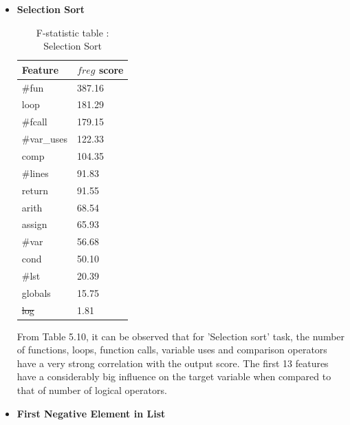 \begin{itemize}
    \item \textbf{Selection Sort
}
            \begin{table}[H]
            \centering
            \begin{tabular}{|l|l|}
            \hline
            \textbf{Feature} & \textbf{$f{reg}$ score} \\ \hline
            \#fun            & 387.16                \\ \hline
            loop             & 181.29                \\ \hline
            \#fcall          & 179.15                \\ \hline
            \#var\_uses      & 122.33                \\ \hline
            comp             & 104.35                \\ \hline
            \#lines          & 91.83                 \\ \hline
            return           & 91.55                 \\ \hline
            arith            & 68.54                 \\ \hline
            assign           & 65.93                 \\ \hline
            \#var            & 56.68                 \\ \hline
            cond             & 50.10                 \\ \hline
            \#lst            & 20.39                 \\ \hline
            globals          & 15.75                 \\ \hline
            \st{log}              & 1.81                  \\ \hline
            \end{tabular}
            \caption{F-statistic table : Selection Sort}
            \label{ss_f}
            \end{table}
            
            From Table 5.10, it can be observed that for 'Selection sort' task, the number of functions, loops, function calls, variable uses and comparison operators have a very strong correlation with the output score. The first 13 features have a considerably big influence on the target variable when compared to that of number of logical operators. 
            
    \item \textbf{First Negative Element in List}


\end{itemize}
